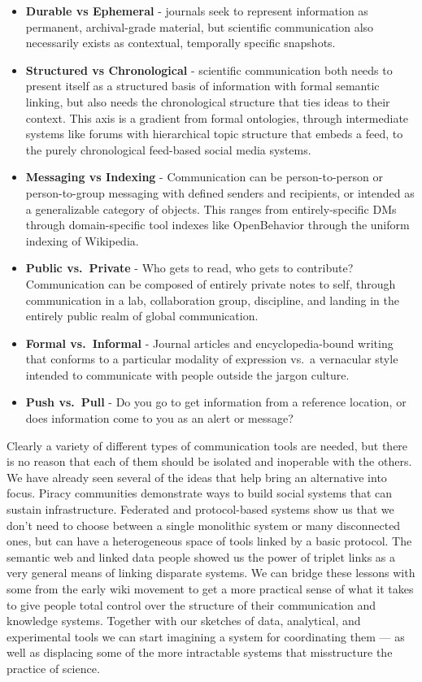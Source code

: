 \documentclass[notoc]{tufte-book}
\begin{document}
\begin{itemize}

\item
  \textbf{Durable vs Ephemeral} - journals seek to represent information
  as permanent, archival-grade material, but scientific communication
  also necessarily exists as contextual, temporally specific snapshots.
\item
  \textbf{Structured vs Chronological} - scientific communication both
  needs to present itself as a structured basis of information with
  formal semantic linking, but also needs the chronological structure
  that ties ideas to their context. This axis is a gradient from formal
  ontologies, through intermediate systems like forums with hierarchical
  topic structure that embeds a feed, to the purely chronological
  feed-based social media systems.
\item
  \textbf{Messaging vs Indexing} - Communication can be person-to-person
  or person-to-group messaging with defined senders and recipients, or
  intended as a generalizable category of objects. This ranges from
  entirely-specific DMs through domain-specific tool indexes like
  OpenBehavior through the uniform indexing of Wikipedia.
\item
  \textbf{Public vs.~Private} - Who gets to read, who gets to
  contribute? Communication can be composed of entirely private notes to
  self, through communication in a lab, collaboration group, discipline,
  and landing in the entirely public realm of global communication.
\item
  \textbf{Formal vs.~Informal} - Journal articles and encyclopedia-bound
  writing that conforms to a particular modality of expression vs.~a
  vernacular style intended to communicate with people outside the
  jargon culture.
\item
  \textbf{Push vs.~Pull} - Do you go to get information from a reference
  location, or does information come to you as an alert or message?
\end{itemize}

Clearly a variety of different types of communication tools are needed,
but there is no reason that each of them should be isolated and
inoperable with the others. We have already seen several of the ideas
that help bring an alternative into focus. Piracy communities
demonstrate ways to build social systems that can sustain
infrastructure. Federated and protocol-based systems show us that we
don't need to choose between a single monolithic system or many
disconnected ones, but can have a heterogeneous space of tools linked by
a basic protocol. The semantic web and linked data people showed us the
power of triplet links as a very general means of linking disparate
systems. We can bridge these lessons with some from the early wiki
movement to get a more practical sense of what it takes to give people
total control over the structure of their communication and knowledge
systems. Together with our sketches of data, analytical, and
experimental tools we can start imagining a system for coordinating them
--- as well as displacing some of the more intractable systems that
misstructure the practice of science.
\end{document}
